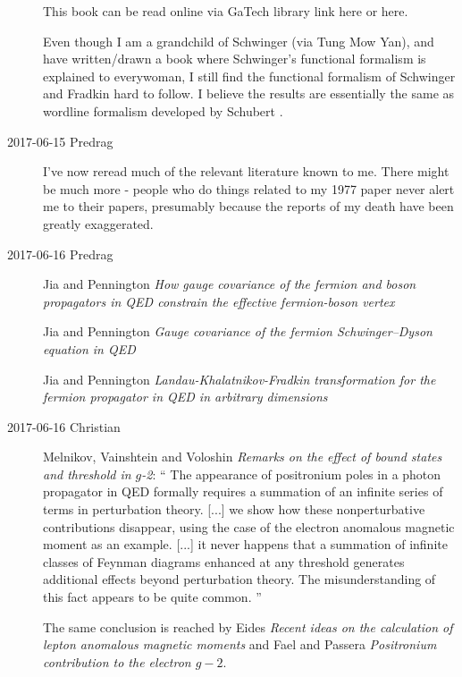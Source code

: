 \begin{description}
This book can be read online via GaTech library link
{here} or
{here}.

Even though I am a grandchild of Schwinger (via Tung Mow Yan), and have
written/drawn a book where Schwinger's functional formalism is explained
to everywoman, I still find the functional formalism of Schwinger and
Fradkin hard to follow. I believe the results are
essentially the same as wordline formalism developed by Schubert \etal.

\item[2017-06-15 Predrag]
I've now reread much of the relevant literature known to me. There might
be much more - people who do things related to my 1977 paper
never alert me to their papers, presumably because the reports of my
death have been greatly exaggerated.

\item[2017-06-16 Predrag]

Jia and Pennington
{\em How gauge covariance of the fermion and boson propagators in {QED}
constrain the effective fermion-boson vertex}

Jia and Pennington
{\em Gauge covariance of the fermion {Schwinger–Dyson} equation in {QED}}

Jia and Pennington
{\em Landau-Khalatnikov-Fradkin transformation for the fermion propagator
in QED in arbitrary dimensions}

\item[2017-06-16 Christian]
Melnikov, Vainshtein and Voloshin
{\em Remarks on the effect of bound states and threshold in $g$-2}:
``
The appearance of positronium poles in a photon propagator in QED
formally requires a summation of an infinite series of terms in
perturbation theory. [...] we show how these nonperturbative
contributions disappear, using the case of the electron anomalous
magnetic moment as an example. [...] it never happens that a summation of
infinite classes of Feynman diagrams enhanced at any threshold generates
additional effects beyond perturbation theory. The misunderstanding of
this fact appears to be quite common.
''

The same conclusion is reached by
Eides
{\em Recent ideas on the calculation of lepton anomalous magnetic moments}
and
Fael and Passera
{\em Positronium contribution to the electron {$g-2$}}.


\end{description}
